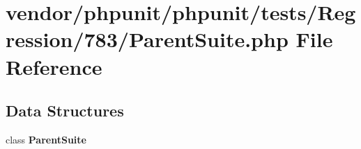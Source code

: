 \section{vendor/phpunit/phpunit/tests/\+Regression/783/\+Parent\+Suite.php File Reference}
\label{_parent_suite_8php}
\subsection*{Data Structures}
\begin{DoxyCompactItemize}
\item 
class {\bf Parent\+Suite}
\end{DoxyCompactItemize}
